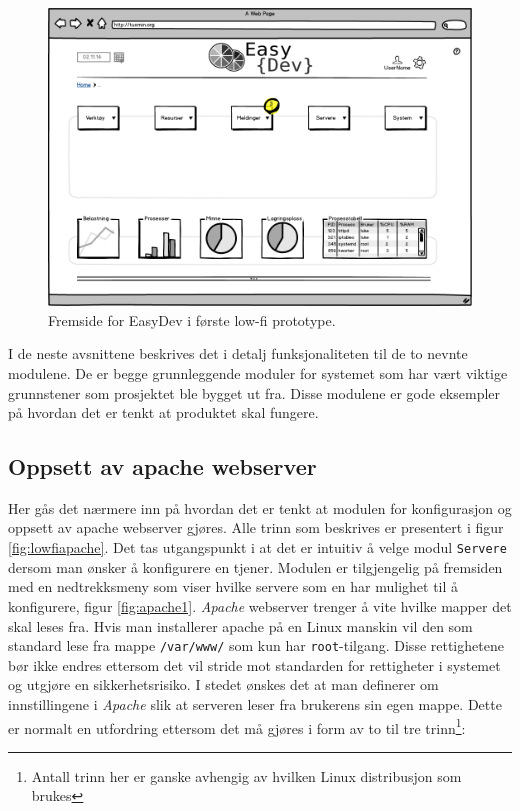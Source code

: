 \begin{figure}[ht]
\includegraphics[width=\textwidth,height=\textheight,keepaspectratio]{./img/prosessdokumentasjon/lowfi/fremside.png}
\caption[Low-fi prototype]{Fremside for EasyDev i første low-fi prototype.}
\label{fig:lowfi_fremside}
\end{figure}


I de neste avsnittene beskrives det i detalj funksjonaliteten til de to nevnte modulene. De er begge grunnleggende moduler for systemet som har vært viktige grunnstener som prosjektet ble bygget ut fra. Disse modulene er gode eksempler på hvordan det er tenkt at produktet skal fungere.

\subsection{Oppsett av apache webserver}
Her gås det nærmere inn på hvordan det er tenkt at modulen for konfigurasjon og oppsett av apache webserver gjøres. Alle trinn som beskrives er presentert i figur \ref{fig:lowfiapache}.
Det tas utgangspunkt i at det er intuitiv å velge modul \texttt{Servere} dersom man ønsker å konfigurere en tjener. Modulen er tilgjengelig på fremsiden med en nedtrekksmeny som viser hvilke servere som en har mulighet til å konfigurere, figur \ref{fig:apache1}. 
\textit{Apache} webserver trenger å vite hvilke mapper det skal leses fra. Hvis man installerer apache på en Linux manskin vil den som standard lese fra mappe \texttt{/var/www/} som kun har \texttt{root}-tilgang. Disse rettighetene bør ikke endres ettersom det vil stride mot standarden for rettigheter i systemet og utgjøre en sikkerhetsrisiko.\cite{book:unixprog}
I stedet ønskes det at man definerer om innstillingene i \textit{Apache} slik at serveren leser fra brukerens sin egen mappe. Dette er normalt en utfordring ettersom det må gjøres i form av to til tre trinn\footnote{Antall trinn her er ganske avhengig av hvilken Linux distribusjon som brukes}:

